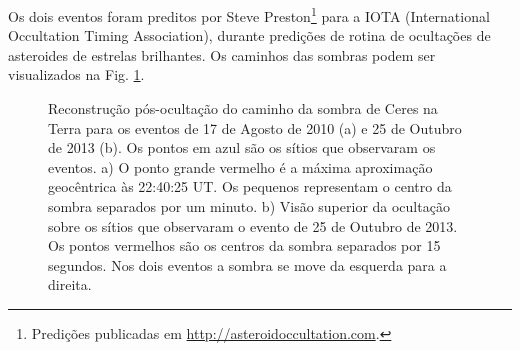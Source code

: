 \documentclass[12pt,a4paper]{monografia}
\begin{document}
Os dois eventos foram preditos por Steve Preston\footnote{Predições publicadas em \url{http://asteroidoccultation.com}.} para a IOTA (International Occultation Timing Association), durante predições de rotina de ocultações de asteroides de estrelas brilhantes. Os caminhos das sombras podem ser visualizados na Fig. \ref{Fig: Ceres-map}.

\begin{figure}[h]
\begin{centering}
\caption{Reconstrução pós-ocultação do caminho da sombra de Ceres na Terra para os eventos de 17 de Agosto de 2010 (a) e 25 de Outubro de 2013 (b). Os pontos em azul são os sítios que observaram os eventos. a) O ponto grande vermelho é a máxima aproximação geocêntrica às 22:40:25 UT. Os pequenos representam o centro da sombra separados por um minuto. b) Visão superior da ocultação sobre os sítios que observaram o evento de 25 de Outubro de 2013. Os pontos vermelhos são os centros da sombra separados por 15 segundos. Nos dois eventos a sombra se move da esquerda para a direita.
\label{Fig: Ceres-map}}
\end{centering}
\end{figure}
\end{document}
